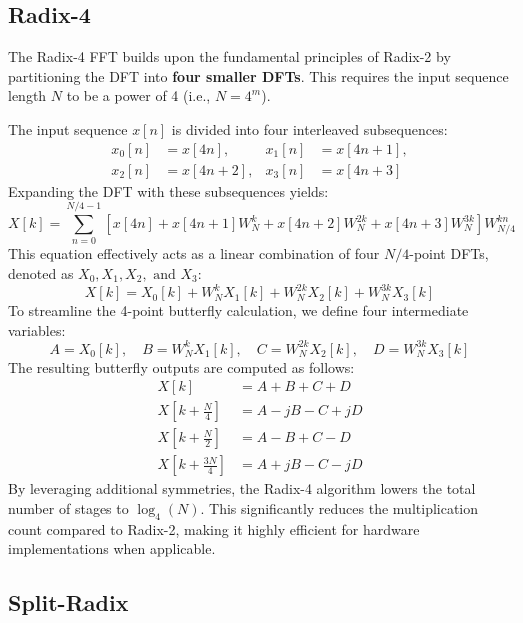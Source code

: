 \subsection{Radix-4}

The Radix-4 FFT builds upon the fundamental principles of Radix-2 by partitioning the DFT into \textbf{four smaller DFTs}. This requires the input sequence length $N$ to be a power of 4 (i.e., $N=4^m$).

The input sequence $x[n]$ is divided into four interleaved subsequences:
\begin{align}
    x_0[n] &= x[4n], & x_1[n] &= x[4n+1], \nonumber \\
    x_2[n] &= x[4n+2], & x_3[n] &= x[4n+3]
\end{align}
Expanding the DFT with these subsequences yields:
\begin{equation}
    X[k] = \sum_{n=0}^{N/4-1} \left[ 
    x[4n] + x[4n+1] W_N^k + x[4n+2] W_N^{2k} + x[4n+3] W_N^{3k}
    \right] W_{N/4}^{kn}
\end{equation}
This equation effectively acts as a linear combination of four $N/4$-point DFTs, denoted as $X_0, X_1, X_2, \text{ and } X_3$:
\begin{equation}
    X[k] = X_0[k] + W_N^k X_1[k] + W_N^{2k} X_2[k] + W_N^{3k} X_3[k]
\end{equation}
To streamline the 4-point butterfly calculation, we define four intermediate variables:
\begin{equation}
    A = X_0[k], \quad B = W_N^k X_1[k], \quad C = W_N^{2k} X_2[k], \quad D = W_N^{3k} X_3[k]
\end{equation}
The resulting butterfly outputs are computed as follows:
\begin{align}
    X[k] &= A + B + C + D \\
    X\left[k + \frac{N}{4}\right] &= A - jB - C + jD \\
    X\left[k + \frac{N}{2}\right] &= A - B + C - D \\
    X\left[k + \frac{3N}{4}\right] &= A + jB - C - jD
\end{align}
By leveraging additional symmetries, the Radix-4 algorithm lowers the total number of stages to $\log_4(N)$. This significantly reduces the multiplication count compared to Radix-2, making it highly efficient for hardware implementations when applicable.

\subsection{Split-Radix}

